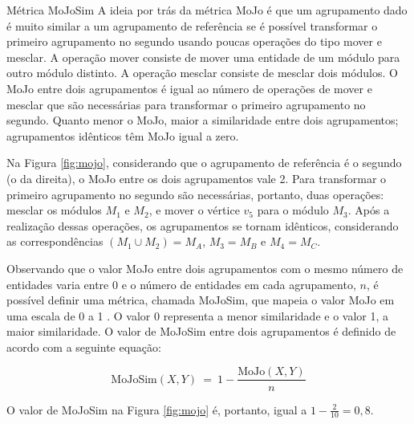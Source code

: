 \begin{chapter}{Métrica MoJoSim}
A ideia por trás da métrica MoJo é que um agrupamento dado é muito similar a um agrupamento de referência se é possível transformar o primeiro agrupamento no segundo usando poucas operações do tipo mover e mesclar. A operação mover consiste de mover uma entidade de um módulo para outro módulo distinto. A operação mesclar consiste de mesclar dois módulos. O MoJo entre  dois agrupamentos é igual ao número de operações de mover e mesclar que são necessárias para transformar o primeiro agrupamento no segundo. Quanto menor o MoJo, maior a similaridade entre dois agrupamentos; agrupamentos idênticos têm MoJo igual a zero.


Na Figura \ref{fig:mojo}, considerando que o agrupamento de referência é o segundo (o da direita), o MoJo entre os dois agrupamentos vale 2. Para transformar o primeiro agrupamento no segundo são necessárias, portanto, duas operações: mesclar os módulos $M_1$ e $M_2$, e mover o vértice $v_5$ para o módulo $M_3$. Após a realização dessas operações, os agrupamentos se tornam idênticos, considerando as correspondências $(M_1 \cup M_2) = M_A$, $M_3 = M_B$ e $M_4 = M_C$.

Observando que o valor MoJo entre dois agrupamentos com o mesmo número de entidades varia entre 0 e o número de entidades em cada agrupamento, $n$, é possível definir uma métrica, chamada MoJoSim, que mapeia o valor MoJo em uma escala de 0 a 1 \cite{Bittencourt2009}. O valor 0 representa a menor similaridade e o valor 1, a maior similaridade. O valor de MoJoSim entre dois agrupamentos é definido de acordo com a seguinte equação:

$$
\mathrm{MoJoSim}(X, Y) ~=~ 1 - \frac{\mathrm{MoJo}(X, Y)}{n}
$$

O valor de MoJoSim na Figura \ref{fig:mojo} é, portanto, igual a $1 - \frac{2}{10} = 0,8$.



\end{chapter}
